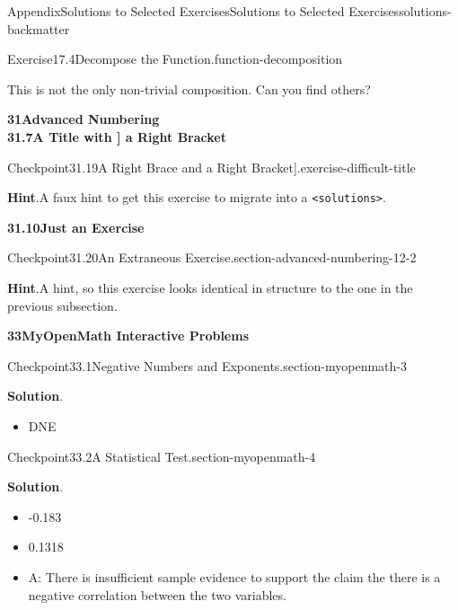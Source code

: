 \documentclass[twoside,10pt,]{article}
\newcommand{\blocktitlefont}{\relax}
\newcommand{\mono}[1]{\texttt{#1}}
\numberwithin{equation}{section}
\begin{document}
\begin{solutions-section}{Appendix}{Solutions to Selected Exercises}{}{Solutions to Selected Exercises}{}{}{solutions-backmatter}
\begin{divisionsolution}{Exercise}{17.4}{Decompose the Function.}{function-decomposition}
\par
This is not the only non-trivial composition. Can you find others?%
\end{divisionsolution}%
\par\medskip
\noindent\textbf{\large{}31\space\textperiodcentered\space{}Advanced Numbering\\
31.7\space\textperiodcentered\space{}A Title with ] a Right Bracket}
\begin{inlinesolution}{Checkpoint}{31.19}{A Right Brace \textbraceright{} and a Right Bracket].}{exercise-difficult-title}%
\par\smallskip%
\noindent\textbf{\blocktitlefont Hint}.\hypertarget{exercise-difficult-title-3-back}{}\quad{}A faux hint to get this exercise to migrate into a \mono{<solutions>}.%
\end{inlinesolution}%
\par\medskip
\noindent\textbf{\large{}31.10\space\textperiodcentered\space{}Just an Exercise}
\begin{inlinesolution}{Checkpoint}{31.20}{An Extraneous Exercise.}{section-advanced-numbering-12-2}%
\par\smallskip%
\noindent\textbf{\blocktitlefont Hint}.\hypertarget{section-advanced-numbering-12-2-3-back}{}\quad{}A hint, so this exercise looks identical in structure to the one in the previous subsection.%
\end{inlinesolution}%
\par\medskip
\noindent\textbf{\large{}33\space\textperiodcentered\space{}MyOpenMath Interactive Problems}
\begin{inlinesolution}{Checkpoint}{33.1}{Negative Numbers and Exponents.}{section-myopenmath-3}%
\par\smallskip%
\noindent\textbf{\blocktitlefont Solution}.\hypertarget{section-myopenmath-3-3-back}{}\quad{}%
\begin{itemize}[label=\textbullet]
\item{}DNE%
\end{itemize}
%
\end{inlinesolution}%
\begin{inlinesolution}{Checkpoint}{33.2}{A Statistical Test.}{section-myopenmath-4}%
\par\smallskip%
\noindent\textbf{\blocktitlefont Solution}.\hypertarget{section-myopenmath-4-3-back}{}\quad{}%
\begin{itemize}[label=\textbullet]
\item{}-0.183%
\item{}0.1318%
\item{}A: There is insufficient sample evidence to support the claim the there is a negative correlation between the two variables.%

\end{itemize}
\end{inlinesolution}
\end{solutions-section}
\end{document}

